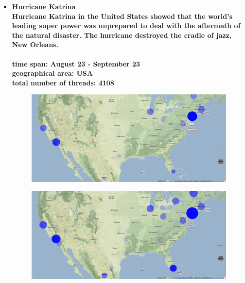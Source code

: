 \documentclass[11pt,a4paper,english]{article}
\begin{document}
\begin{itemize}
						
				\item \bf Hurricane Katrina \rm
					\\ Hurricane Katrina in the United States showed that the world's leading super power was unprepared to deal with the aftermath of the natural disaster. The hurricane destroyed the cradle of jazz, New Orleans. 
					\\\\ \bf time span: \rm August 23 - September 23
					\\ \bf geographical area: \rm USA
					\\ \bf total number of threads: \rm 4108
					\begin{figure}[H]
						\vspace{-5pt}
  							\begin{center}
								\includegraphics[width=130mm]{img/pre-katrina}
							\end{center}
							\vspace{-13pt}
					\end{figure}
					\begin{figure}[H]
						\vspace{-10pt}
						\begin{center}
							\includegraphics[width=130mm]{img/post-katrina}
						\end{center}					
						\vspace{-5pt}
					\end{figure}
					

\end{itemize}
\end{document}
